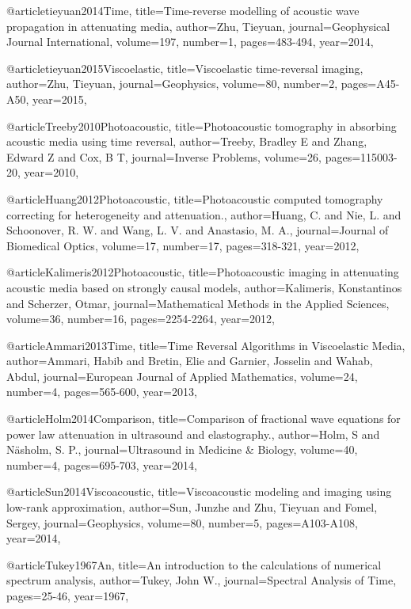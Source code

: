 {@article{tieyuan2014Time,
  title={Time-reverse modelling of acoustic wave propagation in attenuating media},
  author={Zhu, Tieyuan},
  journal={Geophysical Journal International},
  volume={197},
  number={1},
  pages={483-494},
  year={2014},
}

@article{tieyuan2015Viscoelastic,
  title={Viscoelastic time-reversal imaging},
  author={Zhu, Tieyuan},
  journal={Geophysics},
  volume={80},
  number={2},
  pages={A45-A50},
  year={2015},
}

@article{Treeby2010Photoacoustic,
  title={Photoacoustic tomography in absorbing acoustic media using time reversal},
  author={Treeby, Bradley E and Zhang, Edward Z and Cox, B T},
  journal={Inverse Problems},
  volume={26},
  pages={115003-20},
  year={2010},
}

@article{Huang2012Photoacoustic,
  title={Photoacoustic computed tomography correcting for heterogeneity and attenuation.},
  author={Huang, C. and Nie, L. and Schoonover, R. W. and Wang, L. V. and Anastasio, M. A.},
  journal={Journal of Biomedical Optics},
  volume={17},
  number={17},
  pages={318-321},
  year={2012},
}

@article{Kalimeris2012Photoacoustic,
  title={Photoacoustic imaging in attenuating acoustic media based on strongly causal models},
  author={Kalimeris, Konstantinos and Scherzer, Otmar},
  journal={Mathematical Methods in the Applied Sciences},
  volume={36},
  number={16},
  pages={2254-2264},
  year={2012},
}

@article{Ammari2013Time,
  title={Time Reversal Algorithms in Viscoelastic Media},
  author={Ammari, Habib and Bretin, Elie and Garnier, Josselin and Wahab, Abdul},
  journal={European Journal of Applied Mathematics},
  volume={24},
  number={4},
  pages={565-600},
  year={2013},
}

@article{Holm2014Comparison,
  title={Comparison of fractional wave equations for power law attenuation in ultrasound and elastography.},
  author={Holm, S and Näsholm, S. P.},
  journal={Ultrasound in Medicine \& Biology},
  volume={40},
  number={4},
  pages={695-703},
  year={2014},
}

@article{Sun2014Viscoacoustic,
  title={Viscoacoustic modeling and imaging using low-rank approximation},
  author={Sun, Junzhe and Zhu, Tieyuan and Fomel, Sergey},
  journal={Geophysics},
  volume={80},
  number={5},
  pages={A103-A108},
  year={2014},
}

@article{Tukey1967An,
  title={An introduction to the calculations of numerical spectrum analysis},
  author={Tukey, John W.},
  journal={Spectral Analysis of Time},
  pages={25-46},
  year={1967},
}

}
